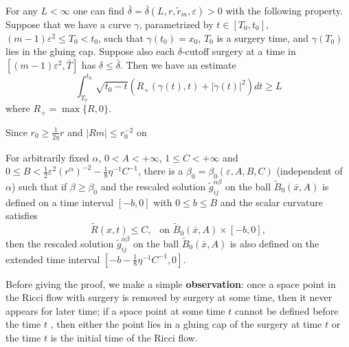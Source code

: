 \begin{lemma}
  \label{lem:cz-surgery-cap-reduced-length-barrier}
For any $L<\infty$ one can find
$\bar{\delta}=\bar{\delta}(L,r,\widetilde{r}_m,\varepsilon)>0$
with the following property. Suppose that we have a curve
$\gamma$, parametrized by $t\in[T_0,t_0]$, $(m-1)\varepsilon^2\leq
T_0<t_0$, such that $\gamma(t_0)=x_0$, $T_0$ is a surgery time,
and $\gamma(T_0)$ lies in the gluing cap. Suppose also each
$\delta$-cutoff surgery at a time in
$[(m-1)\varepsilon^2,\bar{T}]$ has $\delta \leq \bar{\delta}$.
Then we have an estimate \begin{equation}
\int^{t_0}_{T_0}\sqrt{t_0-t}(R_+(\gamma(t),t)
+|\dot{\gamma}(t)|^2)dt\geq L  %
\end{equation} where $R_+=\max\{R,0\}$.

\medskip
Since $r_0\geq \frac{1}{2\eta}r$ and $|Rm|\leq r^{-2}_0$ on
\end{lemma}
\begin{lemma}
  \label{lem:cz-rescaled-ball-backward-extension}
For arbitrarily fixed $\alpha$,
$0<A<+\infty$,  $1 \leq C<+\infty$ and $0 \leq B <
\frac{1}{2}\varepsilon^2(r^{\alpha})^{-2}-
\frac{1}{8}\eta^{-1}C^{-1}$, there is a
$\beta_0=\beta_0(\varepsilon, A, B, C)$ (independent of $\alpha$)
such that if $\beta\geq\beta_0$ and the rescaled solution
$\widetilde{g}^{\alpha\beta}_{ij}$ on the ball
$\widetilde{B}_{0}(\bar{x},A)$ is defined on a time interval
$[-b,0]$ with $0 \leq b \leq B$ and the scalar curvature satisfies
$$\widetilde{R}(x,t)\leq C , \ \ \mbox{ on }
\widetilde{B}_{0}(\bar{x},A) \times [-b,0],$$ then the rescaled
solution $\widetilde{g}^{\alpha\beta}_{ij}$ on the ball
$\widetilde{B}_{0}(\bar{x},A)$ is also defined on the extended
time interval $ [-b-\frac{1}{8}\eta^{-1}C^{-1},0]$.

\medskip
Before giving the proof, we make a simple \textbf{observation}:
once a space point in the Ricci flow with surgery is removed by
surgery at some time, then it never appears for later time; if a
space point at some time $t$ cannot be defined before the time $t$
, then either the point lies in a gluing cap of the surgery at
time $t$ or the time $t$ is the initial time of the Ricci flow.
\end{lemma}
